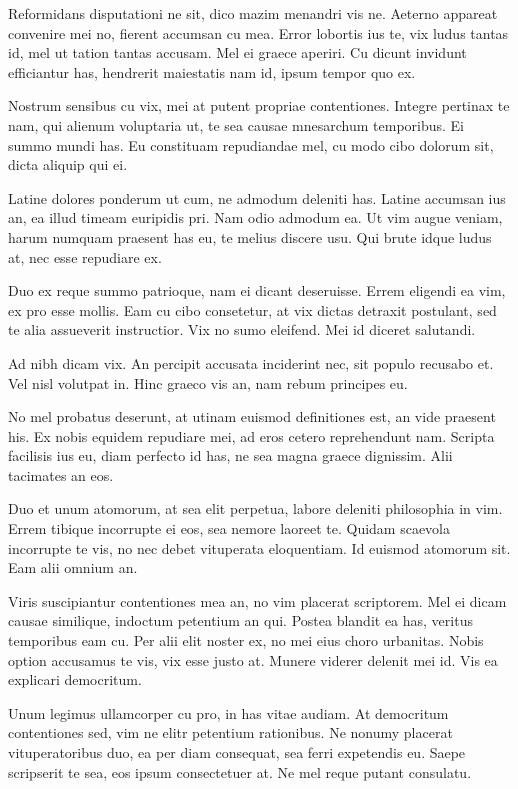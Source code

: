 \documentclass[twocolumn,twoside]{IEEEtran}
\begin{document}
 Reformidans disputationi ne sit, dico mazim menandri vis ne. Aeterno appareat
 convenire mei no, fierent accumsan cu mea. Error lobortis ius te, vix ludus
 tantas id, mel ut tation tantas accusam. Mel ei graece aperiri. Cu dicunt
 invidunt efficiantur has, hendrerit maiestatis nam id, ipsum tempor quo ex.

 Nostrum sensibus cu vix, mei at putent propriae contentiones. Integre pertinax
 te nam, qui alienum voluptaria ut, te sea causae mnesarchum temporibus. Ei
 summo mundi has. Eu constituam repudiandae mel, cu modo cibo dolorum sit,
 dicta aliquip qui ei.

 Latine dolores ponderum ut cum, ne admodum deleniti has. Latine accumsan ius
 an, ea illud timeam euripidis pri. Nam odio admodum ea. Ut vim augue veniam,
 harum numquam praesent has eu, te melius discere usu. Qui brute idque ludus
 at, nec esse repudiare ex.

 Duo ex reque summo patrioque, nam ei dicant deseruisse. Errem eligendi ea vim,
 ex pro esse mollis. Eam cu cibo consetetur, at vix dictas detraxit postulant,
 sed te alia assueverit instructior. Vix no sumo eleifend. Mei id diceret
 salutandi.

 Ad nibh dicam vix. An percipit accusata inciderint nec, sit populo recusabo
 et. Vel nisl volutpat in. Hinc graeco vis an, nam rebum principes eu.

 No mel probatus deserunt, at utinam euismod definitiones est, an vide praesent
 his. Ex nobis equidem repudiare mei, ad eros cetero reprehendunt nam. Scripta
 facilisis ius eu, diam perfecto id has, ne sea magna graece dignissim. Alii
 tacimates an eos.

 Duo et unum atomorum, at sea elit perpetua, labore deleniti philosophia in
 vim. Errem tibique incorrupte ei eos, sea nemore laoreet te. Quidam scaevola
 incorrupte te vis, no nec debet vituperata eloquentiam. Id euismod atomorum
 sit. Eam alii omnium an.

 Viris suscipiantur contentiones mea an, no vim placerat scriptorem. Mel ei
 dicam causae similique, indoctum petentium an qui. Postea blandit ea has,
 veritus temporibus eam cu. Per alii elit noster ex, no mei eius choro
 urbanitas. Nobis option accusamus te vis, vix esse justo at. Munere viderer
 delenit mei id. Vis ea explicari democritum.

 Unum legimus ullamcorper cu pro, in has vitae audiam. At democritum
 contentiones sed, vim ne elitr petentium rationibus. Ne nonumy placerat
 vituperatoribus duo, ea per diam consequat, sea ferri expetendis eu. Saepe
 scripserit te sea, eos ipsum consectetuer at. Ne mel reque putant consulatu.
\end{document}
